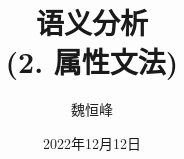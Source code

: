 \documentclass[]{beamer}
\title[语义分析]{语义分析 \\ (2. 属性文法)}
\author[魏恒峰]{\large 魏恒峰}
\institute{hfwei@nju.edu.cn}
\date{2022年12月12日}
\begin{document}
\maketitle




\thankyou{}

\end{document}
